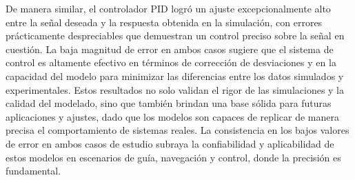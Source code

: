 De manera similar, el controlador PID logró un ajuste excepcionalmente alto entre la señal deseada y la respuesta obtenida en la simulación, con errores prácticamente despreciables que demuestran un control preciso sobre la señal en cuestión. La baja magnitud de error en ambos casos sugiere que el sistema de control es altamente efectivo en términos de corrección de desviaciones y en la capacidad del modelo para minimizar las diferencias entre los datos simulados y experimentales. Estos resultados no solo validan el rigor de las simulaciones y la calidad del modelado, sino que también brindan una base sólida para futuras aplicaciones y ajustes, dado que los modelos son capaces de replicar de manera precisa el comportamiento de sistemas reales. La consistencia en los bajos valores de error en ambos casos de estudio subraya la confiabilidad y aplicabilidad de estos modelos en escenarios de guía, navegación y control, donde la precisión es fundamental.